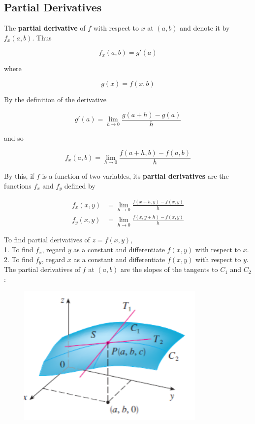    \subsection{Partial Derivatives}    %

        The \textbf{partial derivative} of $f$ with respect to $x$ at $(a,b)$ and denote it by $f_x (a,b)$. Thus

        \[
            f_x (a,b) = g'(a)
        \]

        where

        \[
            g(x) = f(x,b)
        \]

        By the definition of the derivative

        \[
            g'(a) = \lim_{h\to 0} \frac{g(a+h) - g(a)}{h}
        \]

        and so

        \[
            f_x (a,b) = \lim_{h\to 0} \frac{f(a+h,b) - f(a,b)}{h}
        \]

        By this, if $f$ is a function of two variables, its \textbf{partial derivatives} are the functions $f_x$ and $f_y$ defined by

        \begin{align*}
            f_x (x,y)   &= \lim_{h\to 0} \frac{f(x+h, y) - f(x,y)}{h} \\
            f_y (x,y)   &= \lim_{h\to 0} \frac{f(x,y+h) - f(x,y)}{h}
        \end{align*}

        To find partial derivatives of $z=f(x,y)$, \\
        1. To find $f_x$, regard $y$ as a constant and differentiate $f(x,y)$ with respect to $x$. \\
        2. To find $f_y$, regard $x$ as a constant and differentiate $f(x,y)$ with respect to $y$. \\

        The partial derivatives of $f$ at $(a,b)$ are the slopes of the tangents to $C_1$ and $C_2$:

        \begin{figure}[hbt!]
            \centering
            \includegraphics[scale = 0.75]{Resources/14.3_Slopes}
        \end{figure}

